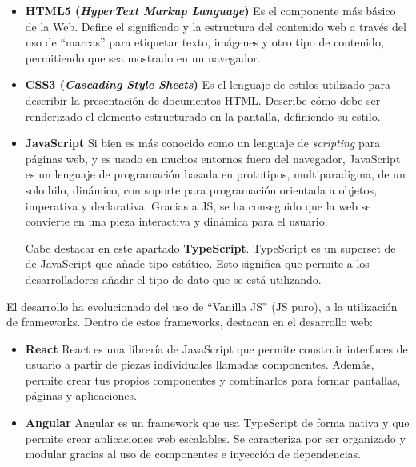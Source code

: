 \begin{itemize}
    \item \textbf{HTML5 (\textit{HyperText Markup Language})} \cite{html}
    \newline
    Es el componente más básico de la Web. Define el significado y la estructura del contenido web a través del uso de 
    ``marcas'' para etiquetar texto, imágenes y otro tipo de contenido, permitiendo que sea mostrado en un navegador.

    \item \textbf{CSS3 (\textit{Cascading Style Sheets})} \cite{css}
    \newline
    Es el lenguaje de estilos utilizado para describir la presentación de documentos HTML. Describe cómo debe ser 
    renderizado el elemento estructurado en la pantalla, definiendo su estilo.

    \item \textbf{JavaScript} \cite{javascript}
    \newline
    Si bien es más conocido como un lenguaje de \textit{scripting} para páginas web, y es usado en muchos entornos 
    fuera del navegador, JavaScript es un lenguaje de programación basada en prototipos, multiparadigma, de un solo 
    hilo, dinámico, con soporte para programación orientada a objetos, imperativa y declarativa. Gracias a JS, se
    ha conseguido que la web se convierte en una pieza interactiva y dinámica para el usuario.

    Cabe destacar en este apartado \textbf{TypeScript}. TypeScript es un superset de de JavaScript que añade tipo estático. 
    Esto significa que permite a los desarrolladores añadir el tipo de dato que se está utilizando. 
\end{itemize}

El desarrollo ha evolucionado del uso de ``Vanilla JS'' (JS puro), a la utilización de frameworks. Dentro de estos frameworks,
destacan en el desarrollo web: 

\begin{itemize}
    \item \textbf{React} \cite{react}
    \newline
    React es una librería de JavaScript que permite construir interfaces de usuario a partir de piezas individuales 
    llamadas componentes. Además, permite crear tus propios componentes y combinarlos para formar pantallas, páginas 
    y aplicaciones.

    \item \textbf{Angular} \cite{angular}
    \newline
    Angular es un framework que usa TypeScript de forma nativa y que permite crear aplicaciones web escalables. Se
    caracteriza por ser organizado y modular gracias al uso de componentes e inyección de dependencias.
\end{itemize}

